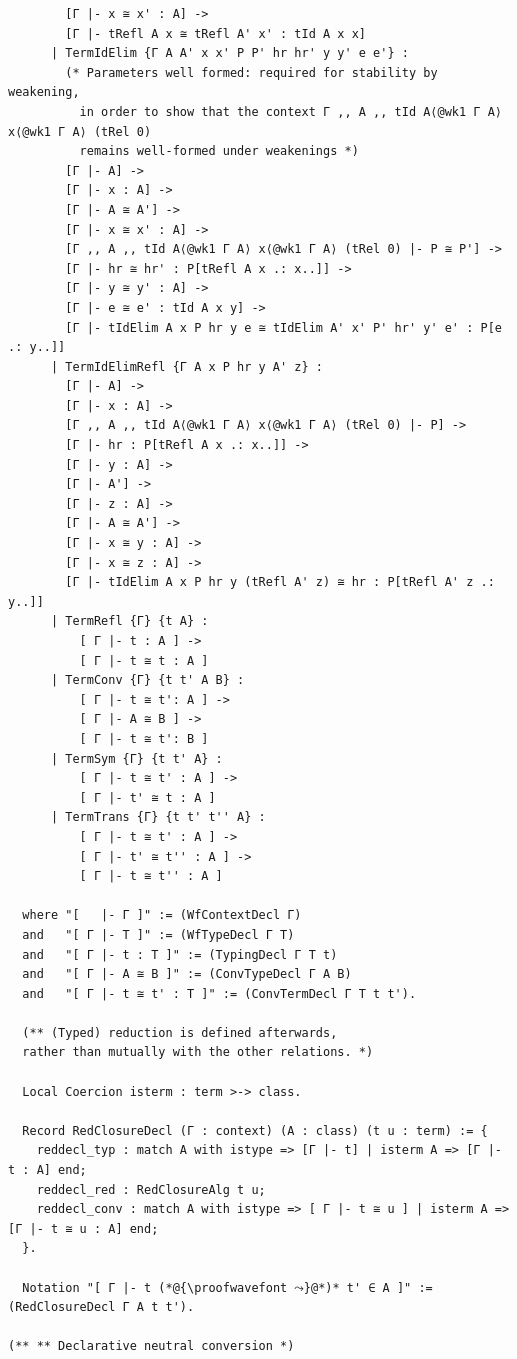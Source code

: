 \documentclass[10pt,a4paper]{amsart}
\begin{document}
\begin{lstlisting}
        [Γ |- x ≅ x' : A] ->
        [Γ |- tRefl A x ≅ tRefl A' x' : tId A x x]
      | TermIdElim {Γ A A' x x' P P' hr hr' y y' e e'} :
        (* Parameters well formed: required for stability by weakening,
          in order to show that the context Γ ,, A ,, tId A⟨@wk1 Γ A⟩ x⟨@wk1 Γ A⟩ (tRel 0)
          remains well-formed under weakenings *)
        [Γ |- A] ->
        [Γ |- x : A] ->
        [Γ |- A ≅ A'] ->
        [Γ |- x ≅ x' : A] ->
        [Γ ,, A ,, tId A⟨@wk1 Γ A⟩ x⟨@wk1 Γ A⟩ (tRel 0) |- P ≅ P'] ->
        [Γ |- hr ≅ hr' : P[tRefl A x .: x..]] ->
        [Γ |- y ≅ y' : A] ->
        [Γ |- e ≅ e' : tId A x y] ->
        [Γ |- tIdElim A x P hr y e ≅ tIdElim A' x' P' hr' y' e' : P[e .: y..]]
      | TermIdElimRefl {Γ A x P hr y A' z} :
        [Γ |- A] ->
        [Γ |- x : A] ->
        [Γ ,, A ,, tId A⟨@wk1 Γ A⟩ x⟨@wk1 Γ A⟩ (tRel 0) |- P] ->
        [Γ |- hr : P[tRefl A x .: x..]] ->
        [Γ |- y : A] ->
        [Γ |- A'] ->
        [Γ |- z : A] ->
        [Γ |- A ≅ A'] ->
        [Γ |- x ≅ y : A] ->
        [Γ |- x ≅ z : A] ->
        [Γ |- tIdElim A x P hr y (tRefl A' z) ≅ hr : P[tRefl A' z .: y..]]
      | TermRefl {Γ} {t A} :
          [ Γ |- t : A ] -> 
          [ Γ |- t ≅ t : A ]
      | TermConv {Γ} {t t' A B} :
          [ Γ |- t ≅ t': A ] ->
          [ Γ |- A ≅ B ] ->
          [ Γ |- t ≅ t': B ]
      | TermSym {Γ} {t t' A} :
          [ Γ |- t ≅ t' : A ] ->
          [ Γ |- t' ≅ t : A ]
      | TermTrans {Γ} {t t' t'' A} :
          [ Γ |- t ≅ t' : A ] ->
          [ Γ |- t' ≅ t'' : A ] ->
          [ Γ |- t ≅ t'' : A ]
      
  where "[   |- Γ ]" := (WfContextDecl Γ)
  and   "[ Γ |- T ]" := (WfTypeDecl Γ T)
  and   "[ Γ |- t : T ]" := (TypingDecl Γ T t)
  and   "[ Γ |- A ≅ B ]" := (ConvTypeDecl Γ A B)
  and   "[ Γ |- t ≅ t' : T ]" := (ConvTermDecl Γ T t t').

  (** (Typed) reduction is defined afterwards,
  rather than mutually with the other relations. *)

  Local Coercion isterm : term >-> class.

  Record RedClosureDecl (Γ : context) (A : class) (t u : term) := {
    reddecl_typ : match A with istype => [Γ |- t] | isterm A => [Γ |- t : A] end;
    reddecl_red : RedClosureAlg t u;
    reddecl_conv : match A with istype => [ Γ |- t ≅ u ] | isterm A => [Γ |- t ≅ u : A] end;
  }.

  Notation "[ Γ |- t (*@{\proofwavefont ⤳}@*)* t' ∈ A ]" := (RedClosureDecl Γ A t t').

(** ** Declarative neutral conversion *)


\end{lstlisting}
\end{document}
